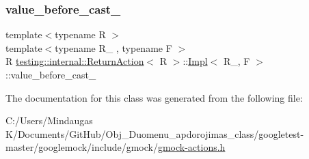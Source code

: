 \mbox{\label{classtesting_1_1internal_1_1_return_action_1_1_impl_a0dbd2f08128302c1395063f84f661366}} 
\subsubsection{\texorpdfstring{value\_before\_cast\_}{value\_before\_cast\_}}
{\footnotesize\ttfamily template$<$typename R $>$ \\
template$<$typename R\+\_\+ , typename F $>$ \\
R \mbox{\hyperlink{classtesting_1_1internal_1_1_return_action}{testing\+::internal\+::\+Return\+Action}}$<$ R $>$\+::\mbox{\hyperlink{classtesting_1_1internal_1_1_return_action_1_1_impl}{Impl}}$<$ R\+\_\+, F $>$\+::value\+\_\+before\+\_\+cast\+\_\+\hspace{0.3cm}{\ttfamily [private]}}



The documentation for this class was generated from the following file\+:\begin{DoxyCompactItemize}
\item 
C\+:/\+Users/\+Mindaugas K/\+Documents/\+Git\+Hub/\+Obj\+\_\+\+Duomenu\+\_\+apdorojimas\+\_\+class/googletest-\/master/googlemock/include/gmock/\mbox{\hyperlink{googletest-master_2googlemock_2include_2gmock_2gmock-actions_8h}{gmock-\/actions.\+h}}\end{DoxyCompactItemize}
